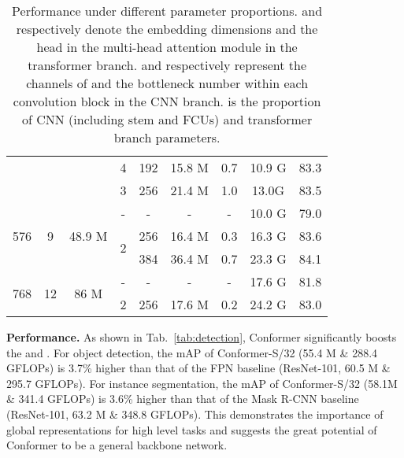 \documentclass[10pt,twocolumn,letterpaper]{article}
\begin{document}
\begin{table}[t]
\begin{tabular}{c|c|c|c|c|c|c|c|c}
                     &                     &                       & 4                  & 192 & 15.8 M      & 0.7                     & 10.9 G                      & 83.3                     \\ \cline{4-9} 
                     &                     &                       & 3                  & 256  &21.4 M   &1.0    & 13.0G       & 83.5                             \\ \hline
\multirow{3}{*}{576} & \multirow{3}{*}{9}  & \multirow{3}{*}{48.9 M} & -                  & -   & -         & -                       & 10.0 G                      & 79.0                     \\ \cline{4-9} 
                     &                     &                       & \multirow{2}{*}{2} & 256 & 16.4 M      & 0.3                     & 16.3 G                      & 83.6                     \\ \cline{5-9} 
                     &                     &                       &                    & 384 & 36.4 M      & 0.7                     & 23.3 G                      & 84.1                     \\ \hline
\multirow{2}{*}{768} & \multirow{2}{*}{12} & \multirow{2}{*}{86 M}   & -                  & -   & -         & -                       & 17.6 G                      & 81.8                     \\ \cline{4-9} 
                     &                     &                       & 2                  & 256 & 17.6 M      & 0.2                     & 24.2 G                     & 83.0                     \\ \bottomrule
\end{tabular}\caption{Performance under different parameter proportions.  and  respectively denote the embedding dimensions and the head in the multi-head attention module in the transformer branch.  and  respectively represent the channels of  and the bottleneck number within each convolution block in the CNN branch.  is the proportion of CNN (including stem and FCUs) and transformer branch parameters. 
}
\label{tab:parameters}
\end{table}

\renewcommand\arraystretch{1.0}

\noindent\textbf{Performance.}
As shown in Tab.~\ref{tab:detection}, Conformer significantly boosts the  and . For object detection, the mAP of Conformer-S/32 (55.4 M \& 288.4 GFLOPs) is 3.7\% higher than that of the FPN baseline (ResNet-101, 60.5 M \& 295.7 GFLOPs). For instance segmentation, the mAP of Conformer-S/32 (58.1M \& 341.4 GFLOPs) is 3.6\% higher than that of the Mask R-CNN baseline (ResNet-101, 63.2 M \& 348.8 GFLOPs). This demonstrates the importance of global representations for high level tasks and suggests the great potential of Conformer to be a general backbone network.
\end{document}
